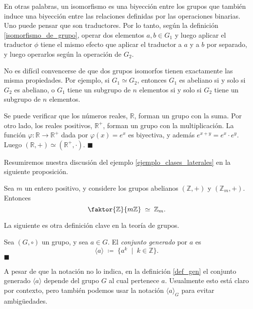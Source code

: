 En otras palabras, un isomorfismo es una biyección entre los grupos que también induce una biyección entre las relaciones definidas por las operaciones binarias. Uno puede pensar que son traductores. Por lo tanto, según la definición \ref{isomorfismo_de_grupo}, operar dos elementos $a, b \in G_1$ y luego aplicar el traductor $\phi$ tiene el mismo efecto que aplicar el traductor a $a$ y a $b$ por separado, y luego operarlos según la operación de $G_2$.

No es difícil convencerse de que dos grupos isomorfos tienen exactamente las misma propiedades. Por ejemplo, si $G_1 \simeq G_2$, entonces $G_1$ es abeliano si y solo si $G_2$ es abeliano, o $G_1$ tiene un subgrupo de $n$ elementos si y solo si $G_2$ tiene un subgrupo de $n$ elementos.


\begin{example} \label{ejemplo_exponencial}
Se puede verificar que los números reales, $\mathbb{R}$, forman un grupo con la suma. Por otro lado, los reales positivos, $\mathbb{R}^{+}$, forman un grupo con la multiplicación. La función $\varphi\colon \mathbb{R} \rightarrow \mathbb{R}^{+}$ dada por $\varphi(x) = e^x$ es biyectiva, y además $e^{x+y} = e^x \cdot e^y$. Luego $(\mathbb{R}, +) \simeq (\mathbb{R}^{+}, \cdot)$. \hfill$\blacksquare$
\end{example}

Resumiremos nuestra discusión del ejemplo \ref{ejemplo_clases_laterales} en la siguiente proposición.

\begin{prop} \label{isomorfismo_Z_m}
Sea $m$ un entero positivo, y considere los grupos abelianos $(\mathbb{Z}, +)$ y $(\mathbb{Z}_m, +)$. Entonces $$\faktor{\mathbb{Z}}{m \mathbb{Z}} \; \simeq \; \mathbb{Z}_m.$$
\end{prop}


La siguiente es otra definición clave en la teoría de grupos.
 
\begin{definition}\label{def_gen}
	Sea $(G,\circ)$ un grupo, y sea $a \in G$.
	El \emph{conjunto generado} por $a$ es
	$$\langle a \rangle \; \coloneq \; \{a^k\; \mid \; k\in\mathbb{Z}\}.$$
    \hfill$\blacksquare$
\end{definition}

A pesar de que la notación no lo indica, en la definición \ref{def_gen} el conjunto generado $\langle a \rangle$ depende del grupo $G$ al cual pertenece $a$. Usualmente esto está claro por contexto, pero también podemos usar la notación $\langle a \rangle_{G}$ para evitar ambigüedades.


